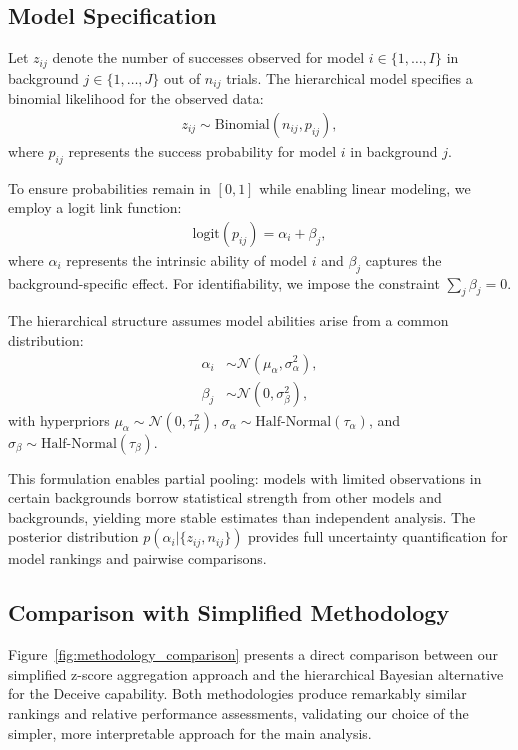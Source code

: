 \documentclass{article}
\begin{document}
\subsection{Model Specification}

Let $z_{ij}$ denote the number of successes observed for model $i \in \{1, \ldots, I\}$ in background $j \in \{1, \ldots, J\}$ out of $n_{ij}$ trials. The hierarchical model specifies a binomial likelihood for the observed data:
\begin{align}
z_{ij} \sim \text{Binomial}(n_{ij}, p_{ij}),
\end{align}
where $p_{ij}$ represents the success probability for model $i$ in background $j$.

To ensure probabilities remain in $[0,1]$ while enabling linear modeling, we employ a logit link function:
\begin{align}
\text{logit}(p_{ij}) = \alpha_i + \beta_j,
\end{align}
where $\alpha_i$ represents the intrinsic ability of model $i$ and $\beta_j$ captures the background-specific effect. For identifiability, we impose the constraint $\sum_j \beta_j = 0$.

The hierarchical structure assumes model abilities arise from a common distribution:
\begin{align}
\alpha_i &\sim \mathcal{N}(\mu_\alpha, \sigma_\alpha^2), \\
\beta_j &\sim \mathcal{N}(0, \sigma_\beta^2),
\end{align}
with hyperpriors $\mu_\alpha \sim \mathcal{N}(0, \tau_\mu^2)$, $\sigma_\alpha \sim \text{Half-Normal}(\tau_\alpha)$, and $\sigma_\beta \sim \text{Half-Normal}(\tau_\beta)$.

This formulation enables partial pooling: models with limited observations in certain backgrounds borrow statistical strength from other models and backgrounds, yielding more stable estimates than independent analysis. The posterior distribution $p(\alpha_i | \{z_{ij}, n_{ij}\})$ provides full uncertainty quantification for model rankings and pairwise comparisons.

\subsection{Comparison with Simplified Methodology}

Figure~\ref{fig:methodology_comparison} presents a direct comparison between our simplified z-score aggregation approach and the hierarchical Bayesian alternative for the Deceive capability. Both methodologies produce remarkably similar rankings and relative performance assessments, validating our choice of the simpler, more interpretable approach for the main analysis.
\end{document}

